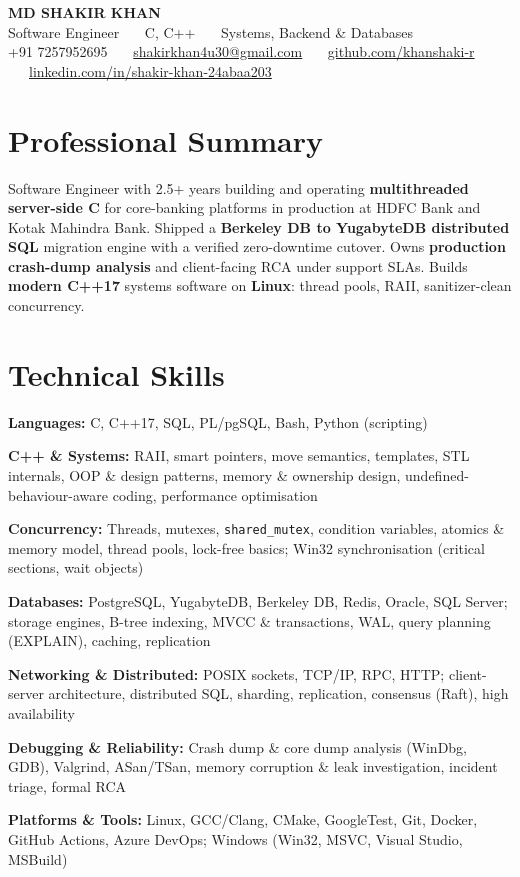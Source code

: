\documentclass[10pt,a4paper]{article}
\newcommand{\skill}[2]{\textbf{#1:} #2\par\vspace{0.1em}}
\begin{document}
\begin{center}
  {\LARGE\bfseries MD SHAKIR KHAN}\\[0.15em]
  {\small Software Engineer \ \textbar\ \ C, C++ \ \textbar\
   \ Systems, Backend \& Databases}\\[0.15em]
  {\footnotesize +91 7257952695 \ \textbar\ \
   \href{mailto:shakirkhan4u30@gmail.com}{shakirkhan4u30@gmail.com} \ \textbar\ \
   \href{https://github.com/khanshaki-r}{github.com/khanshaki-r} \ \textbar\ \
   \href{https://linkedin.com/in/shakir-khan-24abaa203}{linkedin.com/in/shakir-khan-24abaa203}}
\end{center}

\section{Professional Summary}

Software Engineer with 2.5+ years building and operating \textbf{multithreaded server-side C} for
core-banking platforms in production at HDFC Bank and Kotak Mahindra Bank. Shipped a \textbf{Berkeley DB
to YugabyteDB distributed SQL} migration engine with a verified zero-downtime cutover. Owns
\textbf{production crash-dump analysis} and client-facing RCA under support SLAs. Builds
\textbf{modern C++17} systems software on \textbf{Linux}: thread pools, RAII, sanitizer-clean concurrency.

\section{Technical Skills}

\skill{Languages}{C, C++17, SQL, PL/pgSQL, Bash, Python (scripting)}
\skill{C++ \& Systems}{RAII, smart pointers, move semantics, templates, STL internals, OOP \& design
  patterns, memory \& ownership design, undefined-behaviour-aware coding, performance optimisation}
\skill{Concurrency}{Threads, mutexes, \texttt{shared\_mutex}, condition variables, atomics \& memory
  model, thread pools, lock-free basics; Win32 synchronisation (critical sections, wait objects)}
\skill{Databases}{PostgreSQL, YugabyteDB, Berkeley DB, Redis, Oracle, SQL Server; storage engines,
  B-tree indexing, MVCC \& transactions, WAL, query planning (EXPLAIN), caching, replication}
\skill{Networking \& Distributed}{POSIX sockets, TCP/IP, RPC, HTTP; client-server architecture,
  distributed SQL, sharding, replication, consensus (Raft), high availability}
\skill{Debugging \& Reliability}{Crash dump \& core dump analysis (WinDbg, GDB), Valgrind, ASan/TSan,
  memory corruption \& leak investigation, incident triage, formal RCA}
\skill{Platforms \& Tools}{Linux, GCC/Clang, CMake, GoogleTest, Git, Docker, GitHub Actions, Azure
  DevOps; Windows (Win32, MSVC, Visual Studio, MSBuild)}
\end{document}

